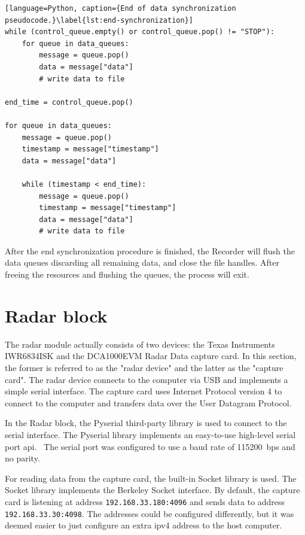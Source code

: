 \begin{lstlisting}[language=Python, caption={End of data synchronization pseudocode.}\label{lst:end-synchronization}]
while (control_queue.empty() or control_queue.pop() != "STOP"):
    for queue in data_queues:
        message = queue.pop()
        data = message["data"]
        # write data to file
        
end_time = control_queue.pop()

for queue in data_queues:
    message = queue.pop()
    timestamp = message["timestamp"]
    data = message["data"]
    
    while (timestamp < end_time):
        message = queue.pop()
        timestamp = message["timestamp"]
        data = message["data"]
        # write data to file
\end{lstlisting}

After the end synchronization procedure is finished,
the Recorder will flush the data queues discarding all remaining data,
and close the file handles.
After freeing the resources and flushing the queues, the process will exit.

\section{Radar block}
\label{sec:3-radar}
The radar module actually consists of two devices: the Texas Instruments IWR6834ISK and the DCA1000EVM Radar Data capture card.
In this section, the former is referred to as the "radar device" and the latter as the "capture card".
The radar device connects to the computer via USB and implements a simple serial interface.
The capture card uses Internet Protocol version 4 to connect to the computer and transfers data over the User Datagram Protocol.

In the Radar block, the Pyserial third-party library is used to connect to the serial interface.
The Pyserial library implements an easy-to-use high-level serial port \gls{api}.~\cite{python-serial}
The serial port was configured to use a baud rate of 115200~bps and no parity.

For reading data from the capture card, the built-in Socket library is used.
The Socket library implements the Berkeley Socket interface.
By default, the capture card is listening at address \texttt{192.168.33.180:4096} and sends data to address \texttt{192.168.33.30:4098}.
The addresses could be configured differently, but it was deemed easier to just configure an extra \gls{ipv4} address to the host computer.~\cite{dca1000-user-guide}

